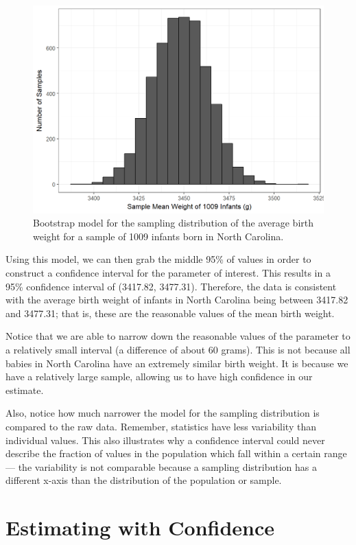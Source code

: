 \documentclass[]{book}
\theoremstyle{plain}
\theoremstyle{mydefn}
\theoremstyle{myexmpl}
\theoremstyle{remark}
\begin{document}
\begin{figure}

{\centering \includegraphics[width=0.8\linewidth]{./Images/singleconfint-samp-distn-1} 

}

\caption{Bootstrap model for the sampling distribution of the average birth weight for a sample of 1009 infants born in North Carolina.}\label{fig:singleconfint-samp-distn}
\end{figure}

Using this model, we can then grab the middle 95\% of values in order to
construct a confidence interval for the parameter of interest. This
results in a 95\% confidence interval of (3417.82, 3477.31). Therefore,
the data is consistent with the average birth weight of infants in North
Carolina being between 3417.82 and 3477.31; that is, these are the
reasonable values of the mean birth weight.

Notice that we are able to narrow down the reasonable values of the
parameter to a relatively small interval (a difference of about 60
grams). This is not because all babies in North Carolina have an
extremely similar birth weight. It is because we have a relatively large
sample, allowing us to have high confidence in our estimate.

Also, notice how much narrower the model for the sampling distribution
is compared to the raw data. Remember, statistics have less variability
than individual values. This also illustrates why a confidence interval
could never describe the fraction of values in the population which fall
within a certain range --- the variability is not comparable because a
sampling distribution has a different x-axis than the distribution of
the population or sample.

\chapter{Estimating with Confidence}\label{SingleTeststat}
\end{document}

